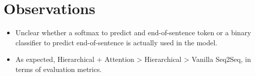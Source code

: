 \documentclass[12pt]{scrartcl}
\begin{document}
\section{Observations}
  \begin{itemize}
    \item Unclear whether a softmax to predict and end-of-sentence token or a binary classifier to predict end-of-sentence is actually used in the model.
    \item As expected, Hierarchical + Attention > Hierarchical > Vanilla Seq2Seq, in terms of evaluation metrics.
  \end{itemize}



\end{document}
